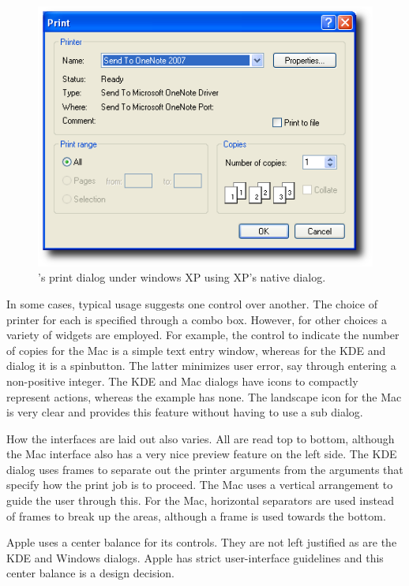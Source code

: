\begin{figure}
  \centering
  \includegraphics[width=.80\textwidth]{r-print-dialog}
  \caption{\R's print dialog under windows XP using XP's native dialog.}
  \label{fig:GUI:print-dialogs-R}
\end{figure}

In some cases, typical usage suggests one control over another. The
choice of printer for each is specified through a combo box. However,
for other choices a variety of widgets are employed. For example, the
control to indicate the number of copies for the Mac is a simple text
entry window, whereas for the KDE and \R\/ dialog it
is a spinbutton. The latter minimizes user error, say through entering
a non-positive integer. The KDE and Mac dialogs have icons to
compactly represent actions, whereas the \R\/ example has none. The
landscape icon for the Mac is very clear and provides this feature
without having to use a sub dialog.


How the interfaces are laid out also varies. All are read top to
bottom, although the Mac interface also has a very nice preview
feature on the left side. The KDE dialog uses frames to
separate out the printer arguments from the arguments that specify how
the print job is to proceed. The Mac uses a vertical arrangement to
guide the user through this. For the Mac, horizontal separators are used instead of
frames to break up the areas, although a frame is used towards the
bottom. 

Apple uses a center balance for its controls. They are not left
justified as are the KDE and Windows dialogs. Apple has strict
user-interface guidelines and this center balance is a design
decision. 




